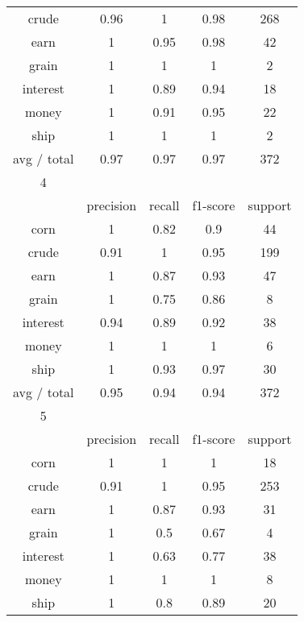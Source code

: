 \documentclass[11pt]{article}
\begin{document}
\begin{center}
\begin{longtable}{| c | c | c | c | c |}
crude         & 0.96      & 1      & 0.98     & 268     \\
earn          & 1         & 0.95   & 0.98     & 42      \\
grain         & 1         & 1      & 1        & 2       \\
interest      & 1         & 0.89   & 0.94     & 18      \\
money         & 1         & 0.91   & 0.95     & 22      \\
ship          & 1         & 1      & 1        & 2       \\
 avg / total   & 0.97      & 0.97   & 0.97     & 372     \\
 \hline
4            &           &        &          &         \\
\hline
             & precision & recall & f1-score & support \\
 corn          & 1         & 0.82   & 0.9      & 44      \\
crude         & 0.91      & 1      & 0.95     & 199     \\
earn          & 1         & 0.87   & 0.93     & 47      \\
grain         & 1         & 0.75   & 0.86     & 8       \\
interest      & 0.94      & 0.89   & 0.92     & 38      \\
money         & 1         & 1      & 1        & 6       \\
ship          & 1         & 0.93   & 0.97     & 30      \\
 avg / total   & 0.95      & 0.94   & 0.94     & 372     \\
 \hline
5            &           &        &          &         \\
\hline
             & precision & recall & f1-score & support \\
 corn          & 1         & 1      & 1        & 18      \\
crude         & 0.91      & 1      & 0.95     & 253     \\
earn          & 1         & 0.87   & 0.93     & 31      \\
grain         & 1         & 0.5    & 0.67     & 4       \\
interest      & 1         & 0.63   & 0.77     & 38      \\
money         & 1         & 1      & 1        & 8       \\
ship          & 1         & 0.8    & 0.89     & 20      \\

\end{longtable}
\end{center}
\end{document}
